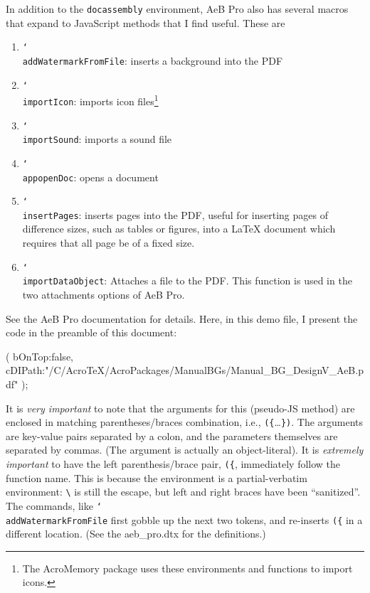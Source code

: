\documentclass{article}
\newcommand{\cs}[1]{\texttt{\char`\\#1}}
\newenvironment{sverbatim}
{\par\footnotesize\verbatim}{\endverbatim}
\begin{document}
In addition to the \texttt{docassembly} environment, AeB Pro also
has several macros that expand to JavaScript methods that I find
useful. These are
\begin{enumerate}
    \item \cs{addWatermarkFromFile}: inserts a background into the PDF

    \item \cs{importIcon}: imports icon files\footnote{The
    AcroMemory package uses these environments and functions to
    import icons.}

    \item \cs{importSound}: imports a sound file

    \item \cs{appopenDoc}: opens a document

    \item \cs{insertPages}: inserts pages into the PDF, useful for
    inserting pages of difference sizes, such as tables or figures,
    into a {\LaTeX} document which requires that all page be of a
    fixed size.

    \item \cs{importDataObject}: Attaches a file to the PDF. This
    function is used in the two attachments options of AeB Pro.
\end{enumerate}
See the AeB Pro documentation for details.  Here, in this demo file,
I present the code in the preamble of this document:
\begin{sverbatim}
\begin{docassembly}
\addWatermarkFromFile({
    bOnTop:false,
    cDIPath:"/C/AcroTeX/AcroPackages/ManualBGs/Manual_BG_DesignV_AeB.pdf"
});
\end{docassembly}
\end{sverbatim}
It is \emph{very important} to note that the arguments for this
(pseudo-JS method) are enclosed in matching parentheses/braces
combination, i.e., \verb!({!\dots\verb!})!. The arguments are
key-value pairs separated by a colon, and the parameters themselves
are separated by commas. (The argument is actually an
object-literal).  It is \emph{extremely important} to have the left
parenthesis/brace pair, \verb!({!, immediately follow the function
name. This is because the environment is a partial-verbatim
environment: \verb!\! is still the escape, but left and right braces
have been ``sanitized''.  The commands, like
\cs{addWatermarkFromFile} first gobble up the next two tokens, and
re-inserts \verb!({! in a different location. (See the
\textsf{aeb\_pro.dtx} for the definitions.)
\end{document}
